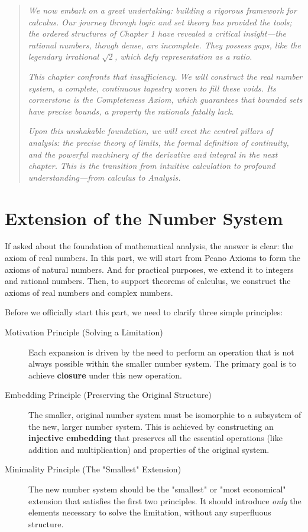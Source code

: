 \documentclass[oneside]{book}
\begin{document}
\begin{quote}
\emph{
We now embark on a great undertaking: building a rigorous framework for calculus. Our journey through logic and set theory has provided the tools; the ordered structures of Chapter 1 have revealed a critical insight—the rational numbers, though dense, are incomplete. They possess gaps, like the legendary irrational $\sqrt{2}$, which defy representation as a ratio.
}

\emph{
This chapter confronts that insufficiency. We will construct the real number system, a complete, continuous tapestry woven to fill these voids. Its cornerstone is the Completeness Axiom, which guarantees that bounded sets have precise bounds, a property the rationals fatally lack.
}

\emph{
Upon this unshakable foundation, we will erect the central pillars of analysis: the precise theory of limits, the formal definition of continuity, and the powerful machinery of the derivative and integral in the next chapter. This is the transition from intuitive calculation to profound understanding—from calculus to Analysis.
}
\end{quote}

\section{Extension of the Number System}
If asked about the foundation of mathematical analysis, the answer is clear: the axiom of real numbers. In this part, we will start from Peano Axioms to form the axioms of natural numbers. And for practical purposes, we extend it to integers and rational numbers. Then, to support theorems of calculus, we construct the axioms of real numbers and complex numbers.

Before we officially start this part, we need to clarify three simple principles:
\begin{description}
    \item[Motivation Principle (Solving a Limitation)] Each expansion is driven by the need to perform an operation that is not always possible within the smaller number system. The primary goal is to achieve \textbf{closure} under this new operation.
    \item[Embedding Principle (Preserving the Original Structure)] The smaller, original number system must be isomorphic to a subsystem of the new, larger number system. This is achieved by constructing an \textbf{injective embedding} that preserves all the essential operations (like addition and multiplication) and properties of the original system.
    \item[Minimality Principle (The "Smallest" Extension)] The new number system should be the "smallest" or "most economical" extension that satisfies the first two principles. It should introduce \emph{only} the elements necessary to solve the limitation, without any superfluous structure.
\end{description}
\end{document}
